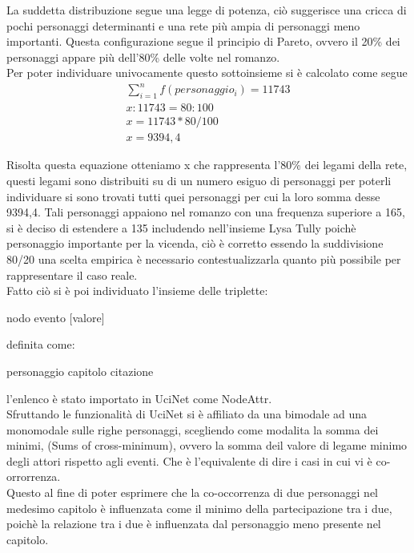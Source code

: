 \documentclass[a4paper]{article}
\begin{document}
La suddetta distribuzione segue una legge di potenza, ciò suggerisce una cricca di pochi personaggi determinanti e una rete più ampia di personaggi meno importanti. Questa configurazione segue il principio di Pareto, ovvero il 20\% dei personaggi appare più dell'80\% delle volte nel romanzo.\\
Per poter individuare univocamente questo sottoinsieme si è calcolato come segue 
\begin{align}
\sum\limits_{i=1}^n f(personaggio_i ) = 11743\\
x:11743=80:100\nonumber\\
x=11743*80/100\nonumber\\
x=9394,4\nonumber  
\end{align}

Risolta questa equazione otteniamo x che rappresenta l'80\% dei legami della rete, questi legami sono distribuiti su di un numero esiguo di personaggi per poterli individuare si sono trovati tutti quei personaggi per cui la loro somma desse 9394,4.
Tali personaggi appaiono nel romanzo con una frequenza superiore a 165, si è deciso di estendere a 135 includendo nell'insieme Lysa Tully poichè personaggio importante per la vicenda, ciò è corretto essendo la suddivisione 80/20 una scelta empirica è necessario contestualizzarla quanto più possibile per rappresentare il caso reale.\\

Fatto ciò si è poi individuato l'insieme delle triplette:
\newtheorem{triplette}{Esempio}
\begin{xxx}
nodo evento [valore]
\end{xxx}
definita come:
\newtheorem{triplette_es}{Esempio}
\begin{xxx}
personaggio capitolo citazione
\end{xxx}
l'enlenco è stato importato in UciNet come NodeAttr.\\

Sfruttando le funzionalità di UciNet si è affiliato da una bimodale ad una monomodale sulle righe personaggi, scegliendo come modalita la somma dei minimi, (Sums of cross-minimum), ovvero la somma deil valore di legame minimo degli attori rispetto agli eventi. Che è l'equivalente di dire i casi in cui vi è co-orrorrenza.\\ 
Questo al fine di poter esprimere che la co-occorrenza di due personaggi nel medesimo capitolo è influenzata come il minimo della partecipazione tra i due, poichè la relazione tra i due è influenzata dal personaggio meno presente nel capitolo.
\end{document}
